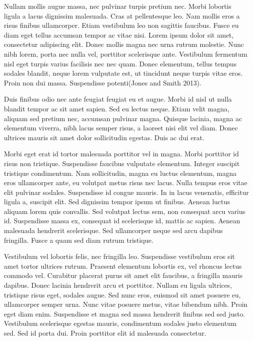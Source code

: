 \documentclass[11pt]{article} %
\begin{document}
Nullam mollis augue massa, nec pulvinar turpis pretium nec. Morbi
lobortis ligula a lacus dignissim malesuada. Cras at pellentesque leo.
Nam mollis eros a risus finibus ullamcorper. Etiam vestibulum leo non
sagittis faucibus. Fusce eu diam eget tellus accumsan tempor ac vitae
nisi. Lorem ipsum dolor sit amet, consectetur adipiscing elit. Donec
mollis magna nec urna rutrum molestie. Nunc nibh lorem, porta nec nulla
vel, porttitor scelerisque ante. Vestibulum fermentum nisl eget turpis
varius facilisis nec nec quam. Donec elementum, tellus tempus sodales
blandit, neque lorem vulputate est, ut tincidunt neque turpis vitae
eros. Proin non dui massa. Suspendisse potenti(Jones and Smith 2013).

Duis finibus odio nec ante feugiat feugiat eu et augue. Morbi id nisl ut
nulla blandit tempor ac sit amet sapien. Sed eu lectus neque. Etiam
velit magna, aliquam sed pretium nec, accumsan pulvinar magna. Quisque
lacinia, magna ac elementum viverra, nibh lacus semper risus, a laoreet
nisi elit vel diam. Donec ultrices mauris sit amet dolor sollicitudin
egestas. Duis ac dui erat.

Morbi eget erat id tortor malesuada porttitor vel in magna. Morbi
porttitor id risus non tristique. Suspendisse faucibus vulputate
elementum. Integer suscipit tristique condimentum. Nam sollicitudin,
magna eu luctus elementum, magna eros ullamcorper ante, eu volutpat
metus risus nec lacus. Nulla tempus eros vitae elit pulvinar sodales.
Suspendisse id congue mauris. In in lacus venenatis, efficitur ligula a,
suscipit elit. Sed dignissim tempor ipsum ut finibus. Aenean luctus
aliquam lorem quis convallis. Sed volutpat lectus sem, non consequat
arcu varius id. Suspendisse massa ex, consequat id scelerisque id,
mattis ac sapien. Aenean malesuada hendrerit scelerisque. Sed
ullamcorper neque sed arcu dapibus fringilla. Fusce a quam sed diam
rutrum tristique.

Vestibulum vel lobortis felis, nec fringilla leo. Suspendisse vestibulum
eros sit amet tortor ultrices rutrum. Praesent elementum lobortis ex,
vel rhoncus lectus commodo vel. Curabitur placerat purus sit amet elit
faucibus, a fringilla mauris dapibus. Donec lacinia hendrerit arcu et
porttitor. Nullam eu ligula ultrices, tristique risus eget, sodales
augue. Sed nunc eros, euismod sit amet posuere eu, ullamcorper semper
urna. Nunc vitae posuere metus, vitae bibendum nibh. Proin eget diam
enim. Suspendisse et magna sed massa hendrerit finibus sed sed justo.
Vestibulum scelerisque egestas mauris, condimentum sodales justo
elementum sed. Sed id porta dui. Proin porttitor elit id malesuada
consectetur.
\end{document}
